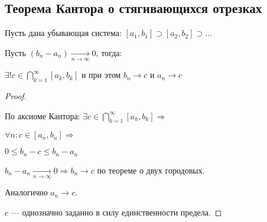 \subsection{Теорема Кантора о стягивающихся отрезках}
\begin{theorem*}{}
    Пусть дана убывающая система: $[a_1, b_1] \supset [a_2, b_2] \supset \dots$
    
    Пусть $\displaystyle (b_n - a_n) \xrightarrow[n \to \infty]{} 0$, тогда:
    
    $\exists! c \in \bigcap\limits_{k = 1}^{\infty}[a_k, b_k]$ и при этом $b_n \to c$ и $a_n \to c$
\end{theorem*}
\begin{proof} $ $

    По аксиоме Кантора: 
    $\exists c \in \bigcap\limits_{k = 1}^{\infty}[a_k,b_k]\Rightarrow$
    
    $\forall n : c \in [a_n, b_n] \Rightarrow$
    
    $0 \leqslant b_n - c \leqslant b_n - a_n$
    
    $b_n - a_n \xrightarrow[n \to \infty]{} 0 \Rightarrow b_n \to c$ по теореме о двух городовых.
    
    Аналогично $a_n \to c$.
    
    $c$ --- однозначно заданно в силу единственности предела.
\end{proof}